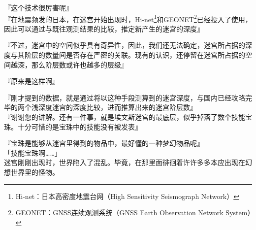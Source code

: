 『这个技术很厉害呢』\\

『在地震频发的日本，在迷宫开始出现时，Hi-net\footnote{Hi-net：日本高密度地震台网（High Sensitivity Seismograph Network）}和GEONET\footnote{GEONET：GNSS连续观测系统（GNSS Earth Observation Network System）}已经投入了使用，因此可以通过与既往观测结果的比较，推定新产生的迷宫的深度』

『不过，迷宫中的空间似乎具有奇异性，因此，我们还无法确定，迷宫所占据的深度与其阶层的数量间是否存在严密的关联。现有的认识，还停留在迷宫所占据的空间越深，那么阶层数或许也越多的层级』

『原来是这样啊』

『刚才提到的数据，就是通过将以这种手段测算到的迷宫深度，与国内已经攻略完毕的两个浅深度迷宫的深度比较，进而推算出来的迷宫阶层数』\\

『谢谢您的讲解。还有一件事，就是埃文斯迷宫的最底层，似乎掉落了数个技能宝珠。十分可惜的是宝珠中的技能没有被发表』

『宝珠是能够从迷宫里得到的物品中，最好懂的一种梦幻物品呢』\\

「技能宝珠啊……」\\

迷宫刚刚出现时，世界陷入了混乱。毕竟，在那里面徘徊着许许多多本应出现在幻想世界里的怪物。

